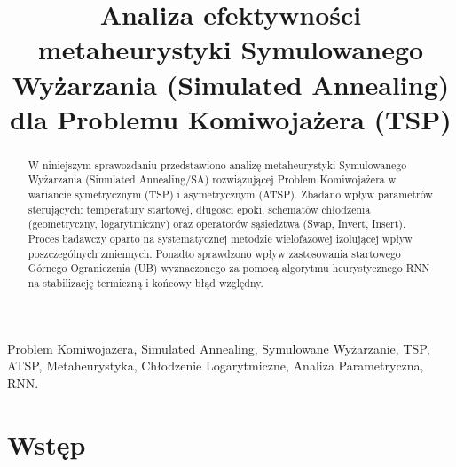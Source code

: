 \documentclass[conference]{IEEEtran}
\begin{document}
    
    \title{Analiza efektywności metaheurystyki Symulowanego Wyżarzania (Simulated Annealing) dla Problemu Komiwojażera (TSP)}
    \author{
        }
    \maketitle
    \thispagestyle{empty}
    \pagestyle{plain}


    \begin{abstract}
        W niniejszym sprawozdaniu przedstawiono analizę metaheurystyki Symulowanego Wyżarzania (Simulated Annealing/SA) rozwiązującej Problem Komiwojażera w wariancie symetrycznym (TSP) i asymetrycznym (ATSP). Zbadano wpływ parametrów sterujących: temperatury startowej, długości epoki, schematów chłodzenia (geometryczny, logarytmiczny) oraz operatorów sąsiedztwa (Swap, Invert, Insert). Proces badawczy oparto na systematycznej metodzie wielofazowej izolującej wpływ poszczególnych zmiennych. Ponadto sprawdzono wpływ zastosowania startowego Górnego Ograniczenia (UB) wyznaczonego za pomocą algorytmu heurystycznego RNN na stabilizację termiczną i końcowy błąd względny.
    \end{abstract}
    \begin{IEEEkeywords}
        Problem Komiwojażera, Simulated Annealing, Symulowane Wyżarzanie, TSP, ATSP, Metaheurystyka, Chłodzenie Logarytmiczne, Analiza Parametryczna, RNN.
    \end{IEEEkeywords}


    \section{Wstęp}
\end{document}
